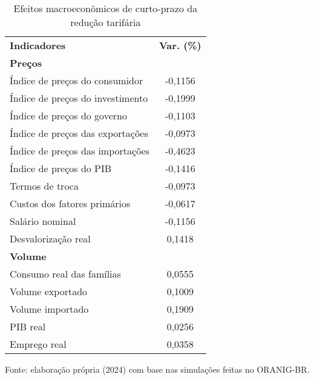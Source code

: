 \begin{table}[h]
	\centering
	\small
	\begin{threeparttable}
		\caption{Efeitos macroeconômicos de curto-prazo da redução tarifária} \label{tab:result}
		\begin{tabular}{m{11cm}c}
			\hline
			\multirow{2}{*}{\textbf{Indicadores}} & \multirow{2}{*}{\textbf{Var. (\%)}} \\
			 &  \\ \hline
			\textbf{Preços} &  \\
			\hspace{0.2cm} Índice de preços do consumidor & -0,1156 \\
			\hspace{0.2cm} Índice de preços do investimento & -0,1999 \\
			\hspace{0.2cm} Índice de preços do governo & -0,1103 \\
			\hspace{0.2cm} Índice de preços das exportações & -0,0973 \\
			\hspace{0.2cm} Índice de preços das importações & -0,4623 \\
			\hspace{0.2cm} Índice de preços do PIB & -0,1416 \\
			\hspace{0.2cm} Termos de troca & -0,0973 \\
			\hspace{0.2cm} Custos dos fatores primários & -0,0617 \\
			\hspace{0.2cm} Salário nominal & -0,1156 \\
			\hspace{0.2cm} Desvalorização real & 0,1418 \\ \hline
			\textbf{Volume} &  \\
			\hspace{0.2cm} Consumo real das famílias & 0,0555 \\
			\hspace{0.2cm} Volume exportado & 0,1009 \\
			\hspace{0.2cm} Volume importado & 0,1909 \\
			\hspace{0.2cm} PIB real & 0,0256 \\
			\hspace{0.2cm} Emprego real & 0,0358 \\ \hline
		\end{tabular}
	\begin{tablenotes}
		\footnotesize
		\item Fonte: elaboração própria (2024) com base nas simulações feitas no ORANIG-BR.
	\end{tablenotes}
	\end{threeparttable}
\end{table}


